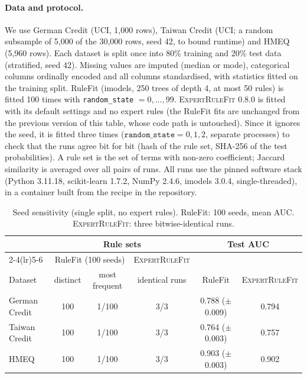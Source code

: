 \documentclass[11pt,a4paper]{article}
\theoremstyle{definition}\newtheorem{definition}{Definition}
\begin{document}
\paragraph{Data and protocol.} We use German Credit (UCI, 1{,}000 rows), Taiwan Credit (UCI; a random subsample of 5{,}000 of the 30{,}000 rows, seed 42, to bound runtime) and HMEQ (5{,}960 rows). Each dataset is split once into 80\% training and 20\% test data (stratified, seed 42). Missing values are imputed (median or mode), categorical columns ordinally encoded and all columns standardised, with statistics fitted on the training split. RuleFit (imodels, 250 trees of depth 4, at most 50 rules) is fitted 100 times with \texttt{random\_state} $=0,\dots,99$. \textsc{ExpertRuleFit} 0.8.0 is fitted with its default settings and no expert rules (the RuleFit fits are unchanged from the previous version of this table, whose code path is untouched). Since it ignores the seed, it is fitted three times ($\texttt{random\_state}=0,1,2$, separate processes) to check that the runs agree bit for bit (hash of the rule set, SHA-256 of the test probabilities). A rule set is the set of terms with non-zero coefficient; Jaccard similarity is averaged over all pairs of runs. All runs use the pinned software stack (Python 3.11.18, scikit-learn 1.7.2, NumPy 2.4.6, imodels 3.0.4, single-threaded), in a container built from the recipe in the repository.

\begin{table}[h]
\centering\small
\caption{Seed sensitivity (single split, no expert rules). RuleFit: 100 seeds, mean AUC. \textsc{ExpertRuleFit}: three bitwise-identical runs.}
\label{tab:results}
\begin{tabular}{@{}lccccc@{}}
\toprule
 & \multicolumn{3}{c}{Rule sets} & \multicolumn{2}{c}{Test AUC}\\
\cmidrule(lr){2-4}\cmidrule(lr){5-6}
 & \multicolumn{2}{c}{RuleFit (100 seeds)} & \textsc{ExpertRuleFit} & & \\
Dataset & distinct & most frequent & identical runs & RuleFit & \textsc{ExpertRuleFit}\\
\midrule
German Credit & 100 & 1/100 & 3/3 & 0.788 ($\pm$0.009) & 0.794\\
Taiwan Credit & 100 & 1/100 & 3/3 & 0.764 ($\pm$0.003) & 0.757\\
HMEQ & 100 & 1/100 & 3/3 & 0.903 ($\pm$0.003) & 0.902\\
\bottomrule
\end{tabular}
\end{table}
\end{document}
